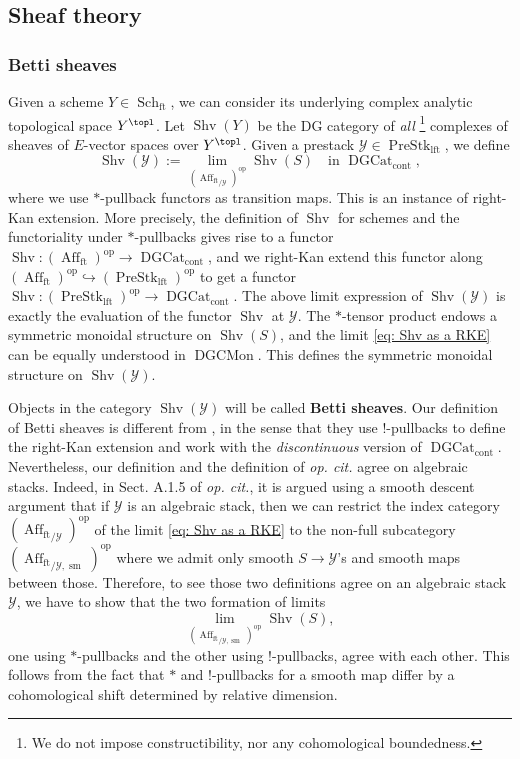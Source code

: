 \documentclass[10pt]{amsart}
\newcommand{\sssec}{\subsubsection}
\theoremstyle{remark}
\newcommand{\te}{\text}
\newcommand{\on}{\operatorname}
\newcommand{\cY}{\mathcal{Y}}
\newcommand{\DGcat}{\on{DGCat}_{\on{cont}}}
\newcommand{\DGCatSymMon}{\on{DGCMon}}
\newcommand{\Shv}{\on{Shv}}
\newcommand{\PreStklft}{\on{PreStk}_{\on{lft}}}
\newcommand{\Affft}{\on{Aff}_{\on{ft}}}
\newcommand{\Schft}{\on{Sch}_{\on{ft}}}
\DeclareMathOperator{\op}{op}
\begin{document}
\subsection{Sheaf theory}
\sssec{Betti sheaves}
Given a scheme $Y\in \Schft$, we can consider its underlying complex analytic topological space $Y^{\topl}$. Let $\Shv(Y)$ be the DG category of \emph{all} \footnote{We do not impose constructibility, nor any cohomological boundedness.} complexes of sheaves of $E$-vector spaces over $Y^{\topl}$. Given a prestack $\cY\in\PreStklft$, we define
\begin{equation}\label{eq: Shv as a RKE}
    \Shv(\cY):=\lim_{({\Affft}_{/\cY})^{\op}}\Shv(S)\quad \te{in }\DGcat,
\end{equation}
where we use $*$-pullback functors as transition maps. This is an instance of right-Kan extension. More precisely, the definition of $\Shv$ for schemes and the functoriality under $*$-pullbacks gives rise to a functor $\Shv:(\Affft)^{\op}\rightarrow\DGcat$, and we right-Kan extend this functor along  $(\Affft)^{\op}\hookrightarrow(\PreStklft)^{\op}$ to get a functor $\Shv:(\PreStklft)^{\op}\rightarrow \DGcat$. The above limit expression of $\Shv(\cY)$ is exactly the evaluation of the functor $\Shv$ at $\cY$. The $*$-tensor product endows a symmetric monoidal structure on $\Shv(S)$, and the limit \eqref{eq: Shv as a RKE} can be equally understood in $\DGCatSymMon$. This defines the symmetric monoidal structure on $\Shv(\cY)$.
\medskip

Objects in the category $\Shv(\cY)$ will be called \textbf{Betti sheaves}. Our definition of Betti sheaves is different from \cite[Sect. A.1]{GKRV}, in the sense that they use $!$-pullbacks to define the right-Kan extension and work with the \emph{discontinuous} version of $\DGcat$. Nevertheless, our definition and the definition of \emph{op. cit.} agree on algebraic stacks. Indeed, in Sect. A.1.5 of \emph{op. cit.}, it is argued using a smooth descent argument that if $\cY$ is an algebraic stack, then we can restrict the index category $({\Affft}_{/\cY})^{\op}$ of the limit \eqref{eq: Shv as a RKE} to the non-full subcategory $({\Affft}_{/\cY,\on{sm}})^{\op}$ where we admit only smooth $S\rightarrow \cY$'s and smooth maps between those. Therefore, to see those two definitions agree on an algebraic stack $\cY$, we have to show that the two formation of limits
\[\lim_{({\Affft}_{/\cY,\on{sm}})^{\op}}\Shv(S),\]
one using $*$-pullbacks and the other using $!$-pullbacks, agree with each other. This follows from the fact that $*$ and $!$-pullbacks for a smooth map differ by a cohomological shift determined by relative dimension.
\end{document}
